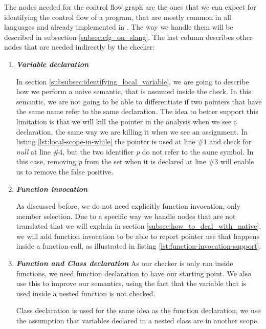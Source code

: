The nodes needed for the control flow graph are the ones that we can expect for identifying the control flow of a program, that are mostly common in all languages and already implemented in \slang{}. 
The way we handle them will be described in subsection \ref{subsec:cfg_on_slang}.
The last column describes other nodes that are needed indirectly by the checker:
\begin{enumerate}
	\item \textbf{\textit{Variable declaration}} \newline
	
	
	In section \ref{subsubsec:identifying_local_variable}, we are going to describe how we perform a naive semantic, that is assumed inside the check.
	In this semantic, we are not going to be able to differentiate if two pointers that have the same name refer to the same declaration.
	The idea to better support this limitation is that we will kill the pointer in the analysis when we see a declaration, the same way we are killing it when we see an assignment.
	In listing \ref{lst:local-scope-in-while} the pointer is used at line $\#1$ and check for \emph{null} at line $\#4$, but the two identifier \emph{p} do not refer to the same symbol.
	In this case, removing \emph{p} from the set when it is declared at line $\#3$ will enable us to remove the false positive.

	\item \textbf{\textit{Function invocation}} \newline
	
	
	As discussed before, we do not need explicitly function invocation, only member selection. 
	Due to a specific way we handle nodes that are not translated that we will explain in section \ref{subsec:how_to_deal_with_native}, we will add function invocation to be able to report pointer use that happens inside a function call, as illustrated in listing \ref{lst:function-invocation-support}.
	
	\item \textbf{\textit{Function and Class declaration}} \newline
	As our checker is only ran inside functions, we need function declaration to have our starting point. 
	We also use this to improve our semantics, using the fact that the variable that is used inside a nested function is not checked.
	
	Class declaration is used for the same idea as the function declaration, we use the assumption that variables declared in a nested class are in another scope.
\end{enumerate}

